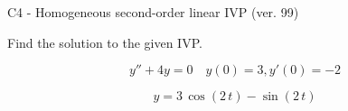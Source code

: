\begin{exercise}
  \begin{exerciseTitle}C4 - Homogeneous second-order linear IVP (ver. 99)\end{exerciseTitle}
  \begin{exerciseStatement}
    
Find the solution to the given IVP.

    
\[y''+4y = 0 \hspace{1em} y(0) = 3 , y'(0) = -2\]

  \end{exerciseStatement}
  \begin{exerciseAnswer}
    
\[y= 3 \, \cos\left(2 \, t\right) - \sin\left(2 \, t\right)\]

  \end{exerciseAnswer}
\end{exercise}